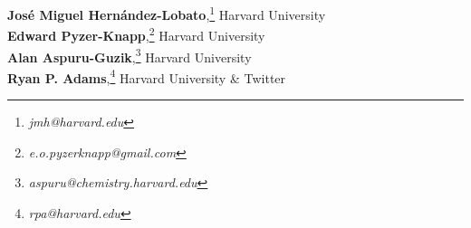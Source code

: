 \textbf{Jos\'e Miguel Hern\'andez-Lobato},\footnote{\textit{jmh@harvard.edu}} {Harvard University}\\ 
\textbf{Edward Pyzer-Knapp},\footnote{\textit{e.o.pyzerknapp@gmail.com}} {Harvard University}\\
\textbf{Alan Aspuru-Guzik},\footnote{\textit{aspuru@chemistry.harvard.edu }} {Harvard University}\\
\textbf{Ryan P. Adams},\footnote{\textit{rpa@harvard.edu}} {Harvard University} \& {Twitter}
